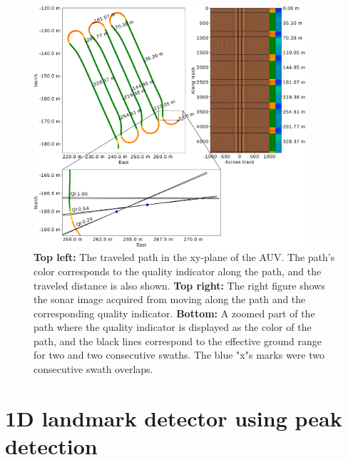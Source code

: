 \begin{figure} [h]%
  \centering
  \includegraphics[trim=0cm 0cm 0cm 0cm, clip=true, width=0.9\textwidth]{figures/quality_indicator_and_path.pdf}
  \caption[Path with quality indicator overlayed]{\textbf{Top left:} The traveled path in the xy-plane of the AUV. The path's color corresponds to the quality indicator along the path, and the traveled distance is also shown. \textbf{Top right:} The right figure shows the sonar image acquired from moving along the path and the corresponding quality indicator. \textbf{Bottom:} A zoomed part of the path where the quality indicator is displayed as the color of the path, and the black lines correspond to the effective ground range for two and two consecutive swaths. The blue "x"s marks were two consecutive swath overlaps.}
  \label{fig:path_and_quality_ind}
\end{figure}

\section{1D landmark detector using peak detection}

